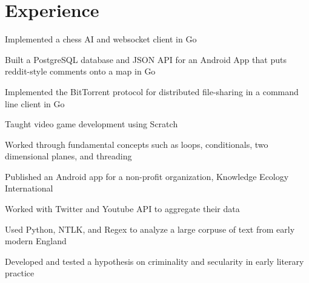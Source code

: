 \documentclass[]{deedy-resume-openfont}
\begin{document}

\section{Experience}
\begin{tightemize}
\item Implemented a chess AI and websocket client in Go
\item Built a PostgreSQL database and JSON API for an Android App that puts reddit-style comments onto a map in Go
\item Implemented the BitTorrent protocol for distributed file-sharing in a command line client in Go
\end{tightemize}
\sectionsep

\begin{tightemize}
\item Taught video game development using Scratch
\item Worked through fundamental concepts such as loops, conditionals, two dimensional planes, and threading
\end{tightemize}
\sectionsep

\begin{tightemize}
\item Published an Android app for a non-profit organization, Knowledge Ecology International
\item Worked with Twitter and Youtube API to aggregate their data
\end{tightemize}
\sectionsep


\begin{tightemize}
\item Used Python, NTLK, and Regex to analyze a large corpuse of text from early modern England
\item Developed and tested a hypothesis on criminality and secularity in early literary practice
\end{tightemize}
\sectionsep
\end{document}
